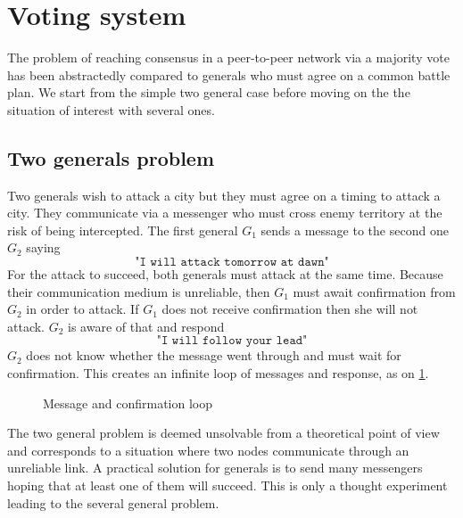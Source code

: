 \section{Voting system}\label{sec:voting} 
The problem of reaching consensus in a peer-to-peer network via a majority vote has been abstractedly compared to generals who must agree on a common battle plan. We start from the simple two general case before moving on the the situation of interest with several ones.
\subsection{Two generals problem}
Two generals wish to attack a city but they must agree on a timing to attack a city. They communicate via a messenger who must cross enemy territory at the risk of being intercepted. The first general $G_1$ sends a message to the second one $G_2$ saying 
$$
\texttt{"I will attack tomorrow at dawn"}
$$
For the attack to succeed, both generals must attack at the same time. Because their communication medium is unreliable, then $G_1$ must await confirmation from $G_2$ in order to attack. If $G_1$ does not receive confirmation then she will not attack. $G_2$ is aware of that and respond 
$$
\texttt{"I will follow your lead"}
$$
$G_2$ does not know whether the message went through and must wait for confirmation. This creates an infinite loop of messages and response, as on \cref{fig:message_loop}.
\begin{figure}[ht!]
 \begin{center}
\end{center}
\caption{Message and confirmation loop}
\label{fig:message_loop}
\end{figure}
The two general problem is deemed unsolvable from a theoretical point of view and corresponds to a situation where two nodes communicate through an unreliable link. A practical solution for generals is to send many messengers hoping that at least one of them will succeed. This is only a thought experiment leading to the several general problem. 
